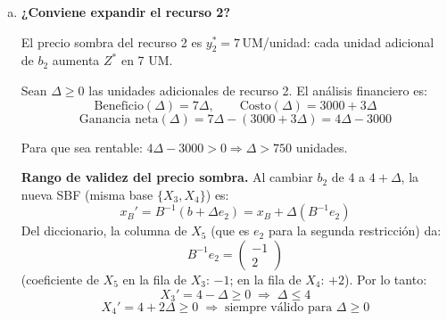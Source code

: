 \documentclass{article}
\begin{document}
\begin{enumerate}[a)]
Verificación de optimalidad dual:
\begin{itemize}
  \item $y_1^*+2y_2^*=14\geq2$ \checkmark, $3(0)+2(7)=14\geq12$ \checkmark, $2(0)+7=7\geq7$ \checkmark.
  \item $W^*=12(0)+4(7)=28=Z^*$ (dualidad fuerte). \checkmark
\end{itemize}

\textit{Diccionario óptimo del dual.} Las variables de holgura del dual son $e_j = (A^\top y)_j - c_j \geq 0$:
$$e_1=y_1+2y_2-2,\quad e_2=3y_1+2y_2-12,\quad e_3=2y_1+y_2-7$$

En el óptimo: $e_3^*=0$ ($X_3$ básica primal), $y_1^*=0$; no-básicas duales: $\{y_1,e_3\}$.

Expresar básicas en función de no-básicas. De $e_3=2y_1+y_2-7$:
$$y_2 = 7-2y_1+e_3 \quad\text{(fila de $y_2$)}$$
Sustituir en $e_1$ y $e_2$:
$$e_1 = y_1+2(7-2y_1+e_3)-2 = 12-3y_1+2e_3 \quad\text{(fila de $e_1$)}$$
$$e_2 = 3y_1+2(7-2y_1+e_3)-12 = 2-y_1+2e_3 \quad\text{(fila de $e_2$)}$$
Fila $W$:
$$W = 12y_1+4(7-2y_1+e_3) = 28+4y_1+4e_3 \quad\text{(fila de $W$)}$$

\textbf{Diccionario óptimo del dual} (base $\{y_2,e_1,e_2\}$, no-básicas $\{y_1,e_3\}=\mathbf{0}$):
$$\begin{aligned}
y_2 &= 7-2y_1+e_3 \\
e_1 &= 12-3y_1+2e_3 \\
e_2 &= 2-y_1+2e_3 \\
W   &= 28+4y_1+4e_3
\end{aligned}$$

Todos los costos reducidos de $W$ son $+4\geq0$ (minimización): \textbf{óptimo}. \checkmark

\item \textbf{¿Conviene expandir el recurso 2?}

El precio sombra del recurso 2 es $y_2^*=7$\,UM/unidad: cada unidad adicional de $b_2$ aumenta $Z^*$ en 7 UM.

Sean $\Delta\geq0$ las unidades adicionales de recurso 2. El análisis financiero es:
$$\text{Beneficio}(\Delta)=7\Delta,\qquad\text{Costo}(\Delta)=3000+3\Delta$$
$$\text{Ganancia neta}(\Delta)=7\Delta-(3000+3\Delta)=4\Delta-3000$$

Para que sea rentable: $4\Delta-3000>0 \Rightarrow \Delta>750$ unidades.

\textbf{Rango de validez del precio sombra.} Al cambiar $b_2$ de $4$ a $4+\Delta$, la nueva SBF (misma base $\{X_3,X_4\}$) es:
$$x_B' = B^{-1}(b+\Delta e_2) = x_B + \Delta(B^{-1}e_2)$$
Del diccionario, la columna de $X_5$ (que es $e_2$ para la segunda restricción) da:
$$B^{-1}e_2 = \begin{pmatrix}-1\\2\end{pmatrix}$$
(coeficiente de $X_5$ en la fila de $X_3$: $-1$; en la fila de $X_4$: $+2$). Por lo tanto:
$$X_3' = 4-\Delta \geq0 \;\Rightarrow\; \Delta\leq4$$
$$X_4' = 4+2\Delta \geq0 \;\Rightarrow\; \text{siempre válido para }\Delta\geq0$$


\end{enumerate}
\end{document}
